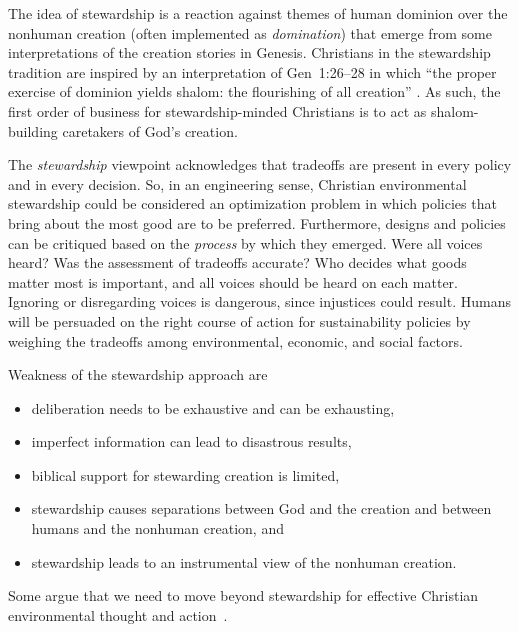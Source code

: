 \documentclass[12pt]{article}
\begin{document}
The idea of stewardship is a reaction 
against themes of human dominion over the nonhuman creation
(often implemented as \emph{domination})
that emerge from some interpretations of the creation stories in Genesis.
Christians in the stewardship tradition are inspired by an interpretation of Gen~1:26–28 in which 
``the proper exercise of dominion yields shalom: the flourishing of all creation'' \autocite{BoumaPrediger:2019}.
As such, the first order of business for stewardship-minded Christians
is to act as shalom-building caretakers of God's creation.

The \emph{stewardship} viewpoint acknowledges that tradeoffs
are present in every policy and in every decision. 
So, in an engineering sense, 
Christian environmental stewardship could be considered an optimization problem
in which policies that bring about the most good 
are to be preferred.
Furthermore, designs and policies can be critiqued 
based on the \emph{process} by which they emerged.
Were all voices heard? Was the assessment of tradeoffs accurate?
Who decides what goods matter most is important, and 
all voices should be heard on each matter.
Ignoring or disregarding voices is dangerous,
since injustices could result.
Humans will be persuaded on the right course of action
for sustainability policies by weighing the tradeoffs 
among environmental, economic, and social factors.

Weakness of the stewardship approach are
%
\begin{itemize}

  \item deliberation needs to be exhaustive and can be exhausting,

  \item imperfect information can lead to disastrous results,
  
  \item biblical support for stewarding creation is limited,
  
  \item stewardship causes separations between God and the creation and between 
        humans and the nonhuman creation, and
		
  \item stewardship leads to an instrumental view of the nonhuman creation.

\end{itemize}

Some argue that we need to move beyond stewardship 
for effective Christian environmental thought and action~\autocite{WarnersHeun:2019aa}.
\end{document}
